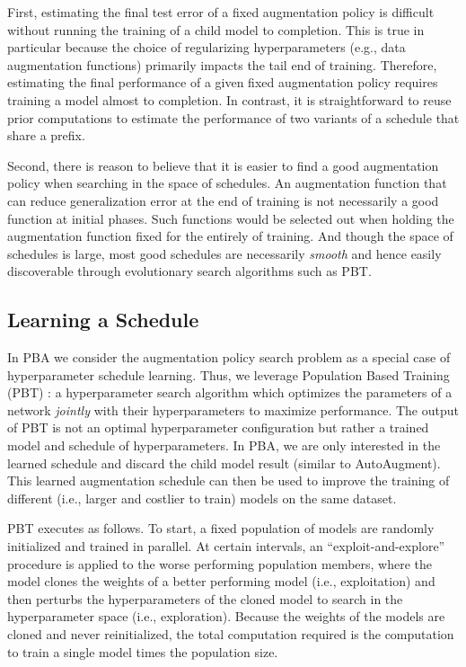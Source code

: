 \documentclass{article}
\begin{document}
First, estimating the final test error of a fixed augmentation policy is difficult without running the training of a child model to completion. This is true in particular because the choice of regularizing hyperparameters (e.g., data augmentation functions) primarily impacts the tail end of training. Therefore, estimating the final performance of a given fixed augmentation policy requires training a model almost to completion. In contrast, it is straightforward to reuse prior computations to estimate the performance of two variants of a schedule that share a prefix.

Second, there is reason to believe that it is easier to find a good augmentation policy when searching in the space of schedules. An augmentation function that can reduce generalization error at the end of training is not necessarily a good function at initial phases. Such functions would be selected out when holding the augmentation function fixed for the entirely of training. And though the space of schedules is large, most good schedules are necessarily \textit{smooth} and hence easily discoverable through evolutionary search algorithms such as PBT.

\subsection{Learning a Schedule}

In PBA we consider the augmentation policy search problem as a special case of hyperparameter schedule learning. Thus, we leverage Population Based Training (PBT) \cite{pbt}: a hyperparameter search algorithm which optimizes the parameters of a network \textit{jointly} with their hyperparameters to maximize performance. The output of PBT is not an optimal hyperparameter configuration but rather a trained model and schedule of hyperparameters. In PBA, we are only interested in the learned schedule and discard the child model result (similar to AutoAugment). This learned augmentation schedule can then be used to improve the training of different (i.e., larger and costlier to train) models on the same dataset.

PBT executes as follows. To start, a fixed population of models are randomly initialized and trained in parallel. At certain intervals, an ``exploit-and-explore'' procedure is applied to the worse performing population members, where the model clones the weights of a better performing model (i.e., exploitation) and then perturbs the hyperparameters of the cloned model to search in the hyperparameter space (i.e., exploration). Because the weights of the models are cloned and never reinitialized, the total computation required is the computation to train a single model times the population size.
\end{document}
